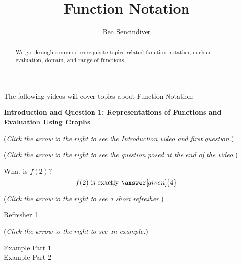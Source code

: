 \documentclass{ximera}
\title[Prerequisite Videos: ]{Function Notation}
\author{Ben Sencindiver}
\begin{document}
\begin{abstract}
  We go through common prerequisite topics related
  function notation, such as evaluation, domain,
  and range of functions.
\end{abstract}
\maketitle

The following videos will cover topics about Function Notation:

\textbf{Introduction and Question 1: Representations of 
Functions and Evaluation Using Graphs}

\begin{question}

\begin{flushright}
{\color{blue}(\emph{Click the arrow to the right
to see the Introduction video and first question.})}
\end{flushright}

\begin{center}
\begin{expandable}
{\color{blue}(\emph{Click the arrow to the right to see the question
posed at the end of the video.})}

\begin{expandable}

What is $f(2)$?\\

\[
f(2) \text{ is exactly }\answer[given]{4}
\]

\begin{flushright}
{\color{blue}(\emph{Click the arrow to the right to see a short refresher.})}
\end{flushright}
\begin{expandable}
Refresher 1
\end{expandable}
\begin{flushright}
{\color{blue}(\emph{Click the arrow to the right to see an example.})}
\end{flushright}
\begin{expandable}
Example Part 1
\\

Example Part 2
\end{expandable}
\end{expandable}
\end{expandable}
\end{center}
\end{question}
\end{document}
